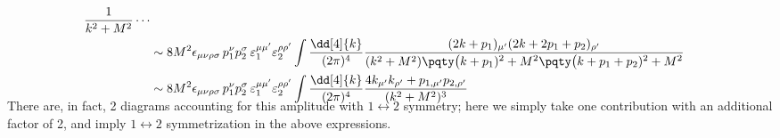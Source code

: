 \documentclass[a4paper,10pt]{article}
\begin{document}
\begin{enumerate}
\begin{enumerate}
\begin{gather}
\begin{aligned}
{				\frac{1}{k^2 + M^2}
				\cdots
			} \\
		&\sim 8M^2 \epsilon_{\mu\nu\rho\sigma}\,
			p_1^\nu p_2^\sigma\,
			\varepsilon_1^{\mu\mu'}
			\varepsilon_2^{\rho\rho'}
		\int \frac{\dd[4]{k}}{(2\pi)^4}
			\frac{
				(2k+p_1)_{\mu'}
				(2k+2p_1+p_2)_{\rho'}
			}{
				(k^2 + M^2)
				\pqty\big{(k+p_1)^2 + M^2}
				\pqty\big{(k+p_1+p_2)^2 + M^2}
			} \\
		&\sim 8M^2 \epsilon_{\mu\nu\rho\sigma}\,
			p_1^\nu p_2^\sigma\,
			\varepsilon_1^{\mu\mu'}
			\varepsilon_2^{\rho\rho'}
		\int \frac{\dd[4]{k}}{(2\pi)^4}
			\frac{
				4k_{\mu'}k_{\rho'}
				+ p_{1,\mu'} p_{2,\rho'}
			}{(k^2 + M^2)^3}\\[-.8\baselineskip]
	\end{aligned}
	\end{gather}
	There are, in fact, 2 diagrams accounting for this amplitude with $
		1\leftrightarrow 2
	$ symmetry; here we simply take one contribution with an additional factor of 2, and imply $
		1\leftrightarrow 2
	$ symmetrization in the above expressions. 
	

\end{enumerate}
\end{enumerate}
\end{document}
